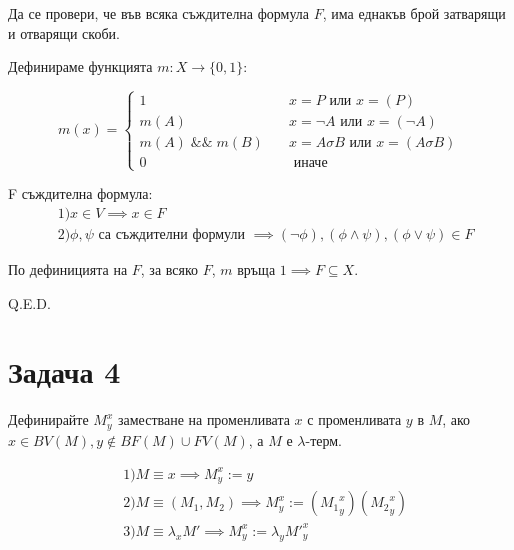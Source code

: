 \documentclass[a4paper]{article}
\begin{document}
Да се провери, че във всяка съждителна формула $F$, има еднакъв брой затварящи и отварящи скоби.

Дефинираме функцията $m : X \rightarrow \{0, 1\}$:

\[ m(x) =
\begin{cases}
  1    & \quad x = P \text{ или } x = (P)\\
  m(A) & \quad x = \neg A \text{ или } x = (\neg A)\\
  m(A)\;\&\&\;m(B) & \quad x = A \sigma B \text{ или } x = (A \sigma B)\\
  0 & \quad \text{ иначе }
\end{cases}
\]

F съждителна формула:
\begin{align*}
&  1) x \in V \implies x \in F\\
&  2) \phi, \psi \text{ са съждителни формули } \implies (\neg \phi), (\phi \land \psi), (\phi \lor \psi) \in F
\end{align*}

По дефиницията на $F$, за всяко $F$, $m \text{ връща } 1 \implies F \subseteq X$.

Q.E.D.

\section*{Задача 4}

Дефинирайте $M^x_y$ заместване на променливата $x$ с променливата $y$ в $M$, ако $x \in BV(M), y \notin BF(M) \cup FV(M)$, а $M$ е $\lambda$-терм.

\begin{align*}
& 1) M \equiv x \implies M^x_y := y \\
& 2) M \equiv (M_1, M_2) \implies M^x_y := ({M_1}^x_y)({M_2}^x_y) \\
& 3) M \equiv \lambda_xM' \implies M^x_y := \lambda_yM'^x_y
\end{align*}
\end{document}
